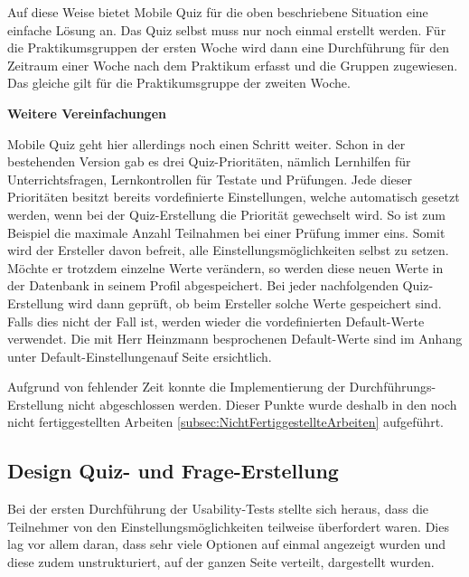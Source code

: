 Auf diese Weise bietet Mobile Quiz für die oben beschriebene Situation eine einfache Lösung an. Das Quiz selbst muss nur noch einmal erstellt werden. Für die Praktikumsgruppen der ersten Woche wird dann eine Durchführung für den Zeitraum einer Woche nach dem Praktikum erfasst und die Gruppen zugewiesen. Das gleiche gilt für die Praktikumsgruppe der zweiten Woche. \\

\bigskip\bigskip

\textbf{Weitere Vereinfachungen}
\bigskip

Mobile Quiz geht hier allerdings noch einen Schritt weiter. Schon in der bestehenden Version gab es drei Quiz-Prioritäten, nämlich Lernhilfen für Unterrichtsfragen, Lernkontrollen für Testate und Prüfungen. Jede dieser Prioritäten besitzt bereits vordefinierte Einstellungen, welche automatisch gesetzt werden, wenn bei der Quiz-Erstellung die Priorität gewechselt wird. So ist zum Beispiel die maximale Anzahl Teilnahmen bei einer Prüfung immer eins. Somit wird der Ersteller davon befreit, alle Einstellungsmöglichkeiten selbst zu setzen. Möchte er trotzdem einzelne Werte verändern, so werden diese neuen Werte in der Datenbank in seinem Profil abgespeichert. Bei jeder nachfolgenden Quiz-Erstellung wird dann geprüft, ob beim Ersteller solche Werte gespeichert sind. Falls dies nicht der Fall ist, werden wieder die vordefinierten Default-Werte verwendet. Die mit Herr Heinzmann besprochenen Default-Werte sind im Anhang unter \glqq Default-Einstellungen\grqq auf Seite \hyperlink{page.\getpagerefnumber{pdf:defaultEinstellungen}}{} ersichtlich.

\bigskip\bigskip

Aufgrund von fehlender Zeit konnte die Implementierung der Durchführungs-Erstellung nicht abgeschlossen werden. Dieser Punkte wurde deshalb in den noch nicht fertiggestellten Arbeiten \ref{subsec:NichtFertiggestellteArbeiten} aufgeführt.





\subsection{Design Quiz- und Frage-Erstellung}
Bei der ersten Durchführung der \gls{Usability-Test}s stellte sich heraus, dass die Teilnehmer von den Einstellungsmöglichkeiten teilweise überfordert waren. Dies lag vor allem daran, dass sehr viele Optionen auf einmal angezeigt wurden und diese zudem unstrukturiert, auf der ganzen Seite verteilt, dargestellt wurden.


